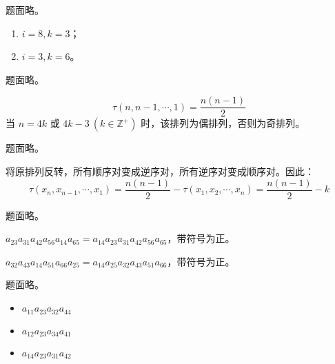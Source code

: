 \begin{problem}[课后习题 2]
	题面略。

	\begin{solution}
		\begin{enumerate}
			\item $i = 8, k = 3$；
			\item $i = 3, k = 6$。
		\end{enumerate}
	\end{solution}
\end{problem}

\begin{problem}[课后习题 4]
	题面略。

	\begin{solution}
		$$
		\tau(n,n-1,\cdots,1) = \frac{n(n-1)}{2}
		$$
		当 $n = 4k \text{ 或 } 4k-3\ (k \in \mathbb{Z}^+)$ 时，该排列为偶排列，否则为奇排列。
	\end{solution}
\end{problem}

\begin{problem}[课后习题 5]
	题面略。

	\begin{solution}
		将原排列反转，所有顺序对变成逆序对，所有逆序对变成顺序对。因此：
		$$
		\tau(x_n,x_{n-1},\cdots,x_1) = \frac{n(n-1)}{2} - \tau(x_1,x_2,\cdots,x_n) = \frac{n(n-1)}{2} - k
		$$
	\end{solution}
\end{problem}

\begin{problem}[课后习题 6]
	题面略。

	\begin{solution}
		$a_{23} a_{31} a_{42} a_{56} a_{14} a_{65} = a_{14} a_{23} a_{31} a_{42} a_{56} a_{65}$，带符号为正。

		$a_{32} a_{43} a_{14} a_{51} a_{66} a_{25} = a_{14} a_{25} a_{32} a_{43} a_{51} a_{66}$，带符号为正。
	\end{solution}
\end{problem}

\begin{problem}[课后习题 7]
	题面略。

	\begin{solution}
		\begin{itemize}
			\item $a_{11} a_{23} a_{32} a_{44}$
			\item $a_{12} a_{23} a_{34} a_{41}$
			\item $a_{14} a_{23} a_{31} a_{42}$
		\end{itemize}
	\end{solution}
\end{problem}

